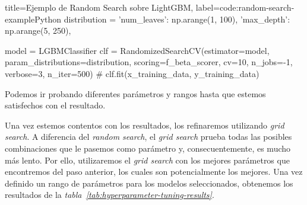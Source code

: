 \begin{code}[numbers=left]{title=Ejemplo de Random Search sobre LightGBM, label=code:random-search-example}{Python}
    distribution = {
        'num_leaves': np.arange(1, 100),
        'max_depth': np.arange(5, 250),
    }

    model = LGBMClassifier
    clf = RandomizedSearchCV(estimator=model, param_distributions=distribution,
                             scoring=f_beta_scorer, cv=10,
                             n_jobs=-1, verbose=3, n_iter=500)
    # clf.fit(x_training_data, y_training_data)
\end{code}

Podemos ir probando diferentes parámetros y rangos hasta que estemos satisfechos con el resultado.

Una vez estemos contentos con los resultados, los refinaremos utilizando \textit{grid search}. A diferencia del \textit{random search}, el \textit{grid search} prueba todas
las posibles combinaciones que le pasemos como parámetro y, consecuentemente, es mucho más lento. Por ello, utilizaremos el \textit{grid search} con los mejores parámetros que
encontremos del paso anterior, los cuales son potencialmente los mejores. Una vez definido un rango de parámetros para los modelos seleccionados, obtenemos los resultados
de la \textit{tabla\ \ref{tab:hyperparameter-tuning-results}}.
